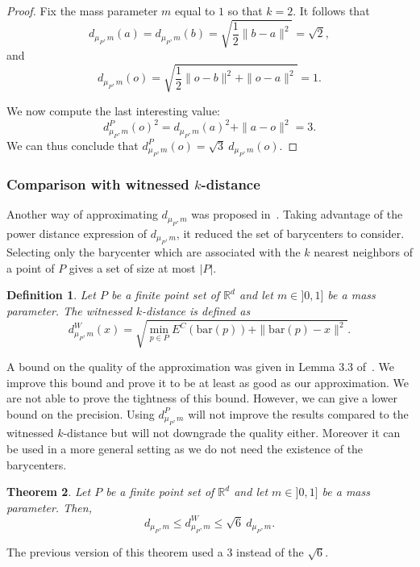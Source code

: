 \documentclass[a4paper]{article}
\newcommand\norm[1]{\|#1\|}
\newcommand\bary[1]{\mathrm{bar}(#1)}
\newcommand\dmP{d_{\mu_P,m}}
\newcommand\dPP{d_{\mu_P,m}^P}
\newcommand\dPW{d_{\mu_P,m}^W}
\newcommand\R{\mathbb{R}}
\newtheorem{theorem}{Theorem}[section]
\newtheorem{definition}[theorem]{Definition}
\begin{document}
\begin{proof}
Fix the mass parameter $m$ equal to $1$ so that $k=2$. 
It follows that
\[
  \dmP(a)=\dmP(b)=\sqrt{\frac{1}{2}\norm{b-a}^2}=\sqrt{2},
\]
and
\[
  \dmP(o)=\sqrt{\frac{1}{2}\norm{o-b}^2+\norm{o-a}^2}=1.
\]

We now compute the last interesting value:
$$\dPP(o)^2=\dmP(a)^2+\norm{a-o}^2=3.$$
We can thus conclude that $\dPP(o)=\sqrt{3}\ \dmP(o)$.
\end{proof}

\subsubsection{Comparison with witnessed $k$-distance}\label{ssCompWkd}

Another way of approximating $\dmP$ was proposed in~\cite{wkdGMM}.
Taking advantage of the power distance expression of $\dmP$, it reduced the set of barycenters to consider.
Selecting only the barycenter which are associated with the $k$ nearest neighbors of a point of $P$ gives a set of size at most $|P|$.

\begin{definition}
Let $P$ be a finite point set of $\R^d$ and let $m\in]0,1]$ be a mass parameter.
The \emph{witnessed $k$-distance} is defined as
$$\dPW(x)=\sqrt{\min_{p\in P}E^C(\bary{p})+\norm{\bary{p}-x}^2}.$$
\end{definition}

A bound on the quality of the approximation was given in Lemma 3.3 of~\cite{wkdGMM}.
We improve this bound and prove it to be at least as good as our approximation. 
We are not able to prove the tightness of this bound.
However, we can give a lower bound on the precision.
Using $\dPP$ will not improve the results compared to the witnessed $k$-distance but will not downgrade the quality either.
Moreover it can be used in a more general setting as we do not need the existence of the barycenters.

\begin{theorem}\label{tWbound}
Let $P$ be a finite point set of $\R^d$ and let $m\in]0,1]$ be a mass parameter.
Then,
$$\dmP\leq\dPW\leq\sqrt{6}\ \dmP.$$
\end{theorem}

The previous version of this theorem used a $3$ instead of the $\sqrt{6}$.
\end{document}
